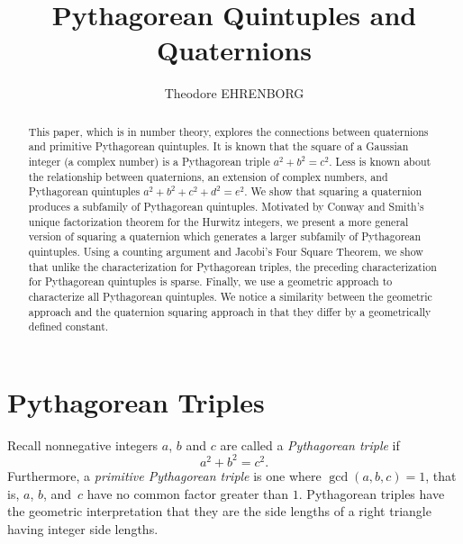 \documentclass[12pt,table]{article}
\theoremstyle{definition}
\theoremstyle{remark}
\numberwithin{equation}{section}
\begin{document}


\title{Pythagorean Quintuples and Quaternions}


\author{\sc Theodore EHRENBORG
}



\date{}

\maketitle



\begin{abstract}
This paper, which is in number theory, explores 
the  
connections between quaternions and primitive Pythagorean quintuples. 
It is known that the square of a Gaussian integer
(a complex number) is a Pythagorean triple $a^2 + b^2 = c^2$.
Less is 
known about the relationship between quaternions, an extension 
of complex numbers, and Pythagorean quintuples
$a^2 + b^2 + c^2 + d^2 = e^2$.
We show that squaring a quaternion produces a subfamily
of Pythagorean quintuples.
Motivated by Conway and Smith's unique
factorization theorem for the
Hurwitz integers,
we present a more general version of
squaring a quaternion which
generates a larger subfamily of Pythagorean quintuples.
Using a counting argument and Jacobi's Four Square Theorem,
we show that unlike the characterization for Pythagorean triples,
the preceding characterization for Pythagorean quintuples is sparse.
Finally, we use a geometric approach to 
characterize 
all Pythagorean
quintuples.
We notice a similarity between the geometric approach
and the quaternion squaring approach in that they
differ by a geometrically defined constant.
\end{abstract}

\listoftodos


\section{Pythagorean Triples}




Recall nonnegative integers $a$, $b$ and $c$ are called a
{\em Pythagorean triple} if
\[
    a^2 + b^2 = c^2.
\]
Furthermore, a {\em primitive Pythagorean triple}
is one where $\gcd(a,b,c) = 1$, that is,
$a$, $b$, and~$c$ have  no common factor greater than $1$.
Pythagorean triples have the geometric interpretation that
they are the side lengths of a right triangle having integer
side lengths.
\end{document}
